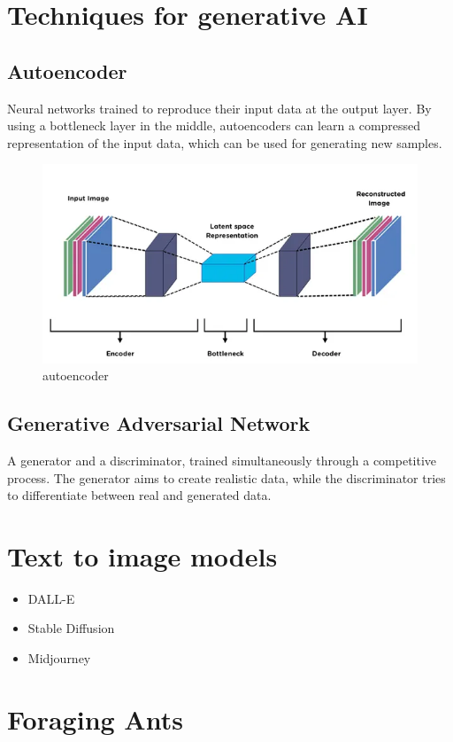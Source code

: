 \documentclass[a4paper,12pt,answers]{article}
\begin{document}
	
	\section{Techniques for generative AI}
	\subsection{Autoencoder}
	
	Neural networks trained to reproduce their input data at the output layer. By using a bottleneck layer in the middle, autoencoders can learn a compressed representation of the input data, which can be used for generating new samples.
	
	\begin{figure}[H]
		\centering
		\includegraphics[width=0.7\linewidth]{images/auto_encoder}
		\caption{autoencoder}
		\label{fig:autoencoder}
	\end{figure}

	
	\subsection{Generative Adversarial Network}
	A generator and a discriminator, trained simultaneously through a competitive process. The generator aims to create realistic data, while the discriminator tries to differentiate between real and generated data.
	
	
	
	\section{Text to image models}
	\begin{itemize}
		\item DALL-E
		\item Stable Diffusion
		\item Midjourney
	\end{itemize}
	
	
	
	\newpage
	\section{Foraging Ants}
\end{document}
